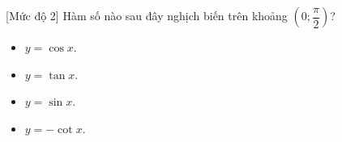 \begin{bt}%
	[Mức độ 2]
	Hàm số nào sau đây nghịch biến trên khoảng $\left(0; \dfrac{\pi}{2}\right)$?
	\begin{itemize}
		\item $y = \cos x$.
		\item $y = \tan x$.
		\item $y = \sin x$.
		\item $y = - \cot x$.
	\end{itemize}
\end{bt}

